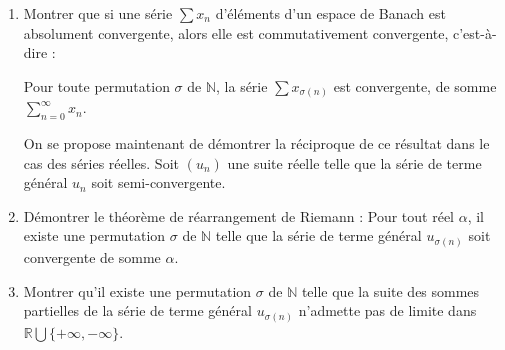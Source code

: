 \begin{exer}
\begin{enumerate}
\item Montrer que si une série $\sum x_n$ d'éléments d'un espace de Banach est absolument convergente, %
alors elle est commutativement convergente, c'est-à-dire :

Pour toute permutation $\sigma$ de $\mathbb{N}$, la série $\sum x_{\sigma(n)}$ est convergente, %
de somme $\sum\limits_{n=0}^{\infty} x_n$.

\medskip
On se propose maintenant de démontrer la réciproque de ce résultat dans le cas des séries réelles. %
Soit $(u_n)$ une suite réelle telle que la série de terme général $u_n$ soit semi-convergente.
\item Démontrer le théorème de réarrangement de Riemann : Pour tout réel $\alpha$, %
il existe une permutation $\sigma$ de $\mathbb{N}$ telle que la série %
de terme général $u_{\sigma(n)}$ soit convergente de somme $\alpha$.
\item Montrer qu'il existe une permutation $\sigma$ de $\mathbb{N}$ telle que %
la suite des sommes partielles de la série de terme général $u_{\sigma(n)}$ n'admette pas de limite %
dans $\mathbb{R} \bigcup \{ +\infty ,-\infty \}$.
\end{enumerate}
\end{exer}

